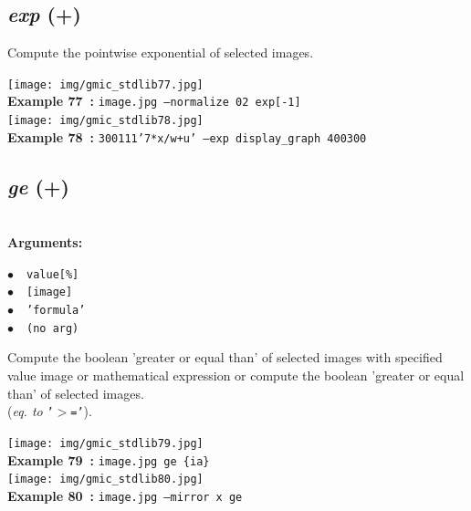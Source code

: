 \documentclass[a4paper,10.5pt,twoside]{book}
\def\comma{\discretionary{,}{}{,}}
\newcommand{\Cb}[1]{\textcolor{cb}{#1}}
\begin{document}
\subsection{\emph{exp} (+)}\vspace*{-0.7em}
Compute the pointwise exponential of selected images.
\begin{center}\texttt{[image: img/gmic\_stdlib77.jpg]}\\
{\footnotesize \textbf{Example 77~:} \texttt{image.jpg --normalize 0{\comma}2 exp[-1]}}
\\\texttt{[image: img/gmic\_stdlib78.jpg]}\\
{\footnotesize \textbf{Example 78~:} \texttt{300{\comma}1{\comma}1{\comma}1{\comma}'7*x/w+u' --exp display\_graph 400{\comma}300}}
\end{center}

\subsection{\emph{ge} (+)}\vspace*{-0.7em}
~\\\textbf{\Cb{Arguments: }}\begin{flushleft}
{\small \Cb{\hspace*{0.5cm}$\bullet$~~\texttt{value[\%]}}}~~~\\
{\small \Cb{\hspace*{0.5cm}$\bullet$~~\texttt{[image]}}}~~~\\
{\small \Cb{\hspace*{0.5cm}$\bullet$~~\texttt{'formula'}}}~~~\\
{\small \Cb{\hspace*{0.5cm}$\bullet$~~\texttt{(no arg)}}}\end{flushleft}
Compute the boolean 'greater or equal than' of selected images with specified value{\comma} image
or mathematical expression{\comma} or compute the boolean 'greater or equal than' of selected images.
~\\(\emph{eq. to} {\small \texttt{'$>$='}}).
\begin{center}\texttt{[image: img/gmic\_stdlib79.jpg]}\\
{\footnotesize \textbf{Example 79~:} \texttt{image.jpg ge \{ia\}}}
\\\texttt{[image: img/gmic\_stdlib80.jpg]}\\
{\footnotesize \textbf{Example 80~:} \texttt{image.jpg --mirror x ge}}
\end{center}
\end{document}
